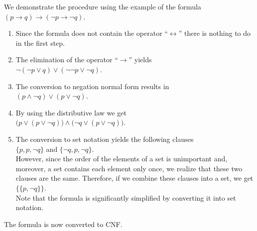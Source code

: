 We demonstrate the procedure using the example of the formula\\[0.2cm]
\hspace*{1.3cm} $(p \rightarrow q) \rightarrow (\neg p \rightarrow \neg q)$.
\begin{enumerate}
\item Since the formula does not contain the operator ``$\leftrightarrow$''
      there is nothing to do in the first step.
\item The elimination of the operator ``$\rightarrow$'' yields \\[0.2cm]
      \hspace*{1.3cm} $\neg (\neg p \vee q) \vee (\neg \neg p \vee \neg q)$.
\item The conversion to negation normal form results in \\[0.2cm]
      \hspace*{1.3cm} $(p \wedge \neg q) \vee (p \vee \neg q)$.
\item By using the distributive law we get \\[0.2cm]
      \hspace*{1.3cm} $\bigl(p \vee (p \vee \neg q)\bigr) \wedge \bigl(\neg q \vee (p \vee \neg q)\bigr)$.
\item The conversion to set notation yields the following clauses \\[0.2cm] 
      \hspace*{1.3cm} $\{p, p, \neg q\}$ \quad and \quad $\{\neg q, p, \neg q\}$. \\[0.2cm]
      However, since the order of the elements of a set is unimportant and, moreover, a set
      contains each element only once, we realize that these two clauses are the same.
      Therefore, if we combine these clauses into a set, we get \\[0.2cm]
      \hspace*{1.3cm} $\bigl\{ \{p, \neg q\} \bigr\}$. \\[0.2cm]
      Note that the formula is significantly simplified by converting it into set
      notation.
\end{enumerate}
The formula is now converted to CNF.

